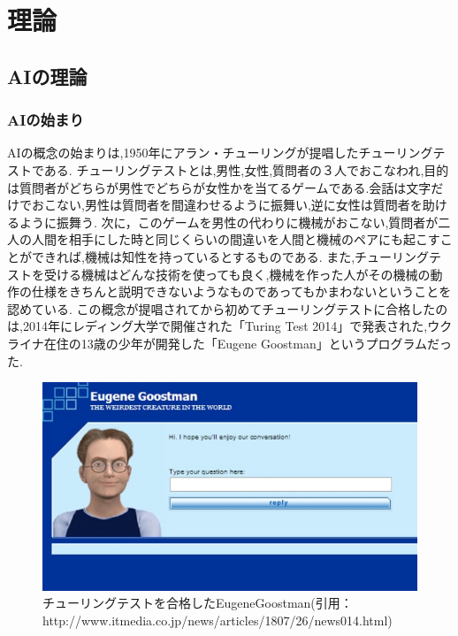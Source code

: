\chapter{理論}
\section{AIの理論}
\subsection{AIの始まり}
AIの概念の始まりは,1950年にアラン・チューリングが提唱したチューリングテストである.\cite{ronbun1}
チューリングテストとは,男性,女性,質問者の３人でおこなわれ,目的は質問者がどちらが男性でどちらが女性かを当てるゲームである.会話は文字だけでおこない,男性は質問者を間違わせるように振舞い,逆に女性は質問者を助けるように振舞う.
次に，このゲームを男性の代わりに機械がおこない,質問者が二人の人間を相手にした時と同じくらいの間違いを人間と機械のペアにも起こすことができれば,機械は知性を持っているとするものである.
また,チューリングテストを受ける機械はどんな技術を使っても良く,機械を作った人がその機械の動作の仕様をきちんと説明できないようなものであってもかまわないということを認めている.
この概念が提唱されてから初めてチューリングテストに合格したのは,2014年にレディング大学で開催された「Turing Test 2014」で発表された,ウクライナ在住の13歳の少年が開発した「Eugene Goostman」というプログラムだった.
\begin{figure}[!ht]
    \begin{screen}
    \begin{center}
        \includegraphics[scale=0.6, clip]{./img/Eugene_Goostman.jpg}
        \caption{チューリングテストを合格したEugeneGoostman\newline(引用：http://www.itmedia.co.jp/news/articles/1807/26/news014.html)}
        \label{fig:チューリングテストを合格したEugeneGoostman}
    \end{center}
\end{screen}
\end{figure}
